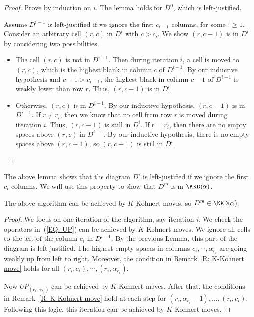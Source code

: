 \begin{proof}
Prove by induction on $i$.
The lemma holds for $D^0$, which is left-justified.

Assume $D^{i-1}$ is left-justified if we ignore the first $c_{i-1}$ columns,
for some $i \geq 1$.
Consider an arbitrary cell $(r,c)$ in $D^i$
with $c > c_i$.
We show $(r, c-1)$ is in $D^i$ by considering two possibilities.
\begin{itemize}
\item[-] The cell $(r,c)$ is not in $D^{i-1}$.
Then during iteration $i$, a cell is moved to $(r,c)$,
which is the highest blank in column $c$ of $D^{i-1}$.
By our inductive hypothesis and $c-1 > c_{i-1}$, 
the highest blank in column $c-1$ of $D^{i-1}$
is weakly lower than row $r$.
Thus, $(r,c-1)$ is in $D^i$.
\item[-] Otherwise, $(r,c)$ is in $D^{i-1}$.
By our inductive hypothesis, 
$(r, c-1)$ is in $D^{i-1}$.
If $r \neq r_i$,
then we know that no cell from row $r$ is moved 
during iteration $i$.
Thus, $(r,c-1)$ is still in $D^i$.
If $r = r_i$,
then there are no empty spaces above $(r,c)$
in $D^{i-1}$.
By our inductive hypothesis, 
there is no empty spaces above $(r,c-1)$,
so $(r,c-1)$ is still in $D^i$. \qedhere
\end{itemize}
\end{proof}

The above lemma shows that the diagram $D^i$ is left-justified if we ignore the first $c_i$ columns.
We will use this property to show that $D^m$ 
is in $\KKD(\alpha)$.
\begin{prop}\label{P: Top Las 1}
The above algorithm can be achieved by $K$-Kohnert moves,
so $D^m \in \KKD(\alpha)$.
\end{prop}

\begin{proof}
We focus on one iteration of the algorithm,
say iteration $i$.
We check the operators 
in~(\ref{EQ: UP}) can be achieved by $K$-Kohnert moves. 
We ignore all cells to the left of the column $c_i$ in $D^{i-1}$.
By the previous Lemma, this part of the diagram 
is left-justified.
The highest empty spaces in columns $c_i, \cdots, \alpha_{r_i}$
are going weakly up from left to right.
Moreover, the condition in Remark~\ref{R: K-Kohnert move} 
holds for all $(r_i, c_i), \cdots, (r_i, \alpha_{r_i})$.

Now $UP_{(r_i, \alpha_{r_i})}$
can be achieved by $K$-Kohnert moves.
After that, the conditions in Remark~\ref{R: K-Kohnert move} 
hold at each step for $(r_i, \alpha_{r_i} - 1), \dots, (r_i, c_i)$.
Following this logic, this iteration can be achieved by $K$-Kohnert moves. 
\end{proof}

